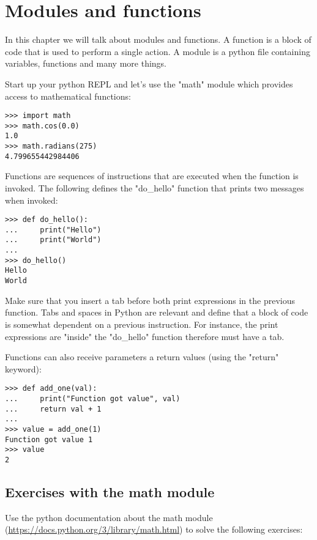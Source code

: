 \chapter{Modules and functions}\label{functions}

In this chapter we will talk about modules and functions. A function is a block of code that is used to perform a single action. A module is a python file containing variables, functions and many more things. 

Start up your python REPL and let's use the "math" module which provides access to mathematical functions:

\begin{lstlisting}
>>> import math
>>> math.cos(0.0)
1.0
>>> math.radians(275)
4.799655442984406
\end{lstlisting}

Functions are sequences of instructions that are executed when the function is invoked. The following defines the "do\_hello" function that prints two messages when invoked:

\begin{lstlisting}
>>> def do_hello():
...     print("Hello")
...     print("World")
... 
>>> do_hello()
Hello
World
\end{lstlisting}

Make sure that you insert a tab before both print expressions in the previous function. Tabs and spaces in Python are relevant and define that a block of code is somewhat dependent on a previous instruction. For instance, the print expressions are "inside" the "do\_hello" function therefore must have a tab.

Functions can also receive parameters a return values (using the "return" keyword):

\begin{lstlisting}
>>> def add_one(val):
...     print("Function got value", val)
...     return val + 1
... 
>>> value = add_one(1)
Function got value 1
>>> value
2
\end{lstlisting}

\section{Exercises with the math module}

Use the python documentation about the math module (\url{https://docs.python.org/3/library/math.html}) to solve the following exercises:

